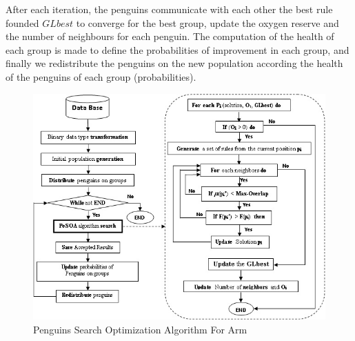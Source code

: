 \documentclass[preprint,12pt]{elsarticle}
\begin{document}
 After each iteration, the penguins communicate with each other the best rule founded  $GLbest$ to converge for the best group, update the oxygen reserve and the number of neighbours  for each penguin. The computation of the health of each group is made to  define the probabilities of improvement in each group, and finally we redistribute the penguins on the new population according the health of the penguins of each group (probabilities). 
\begin{figure}[htbp]
\begin{center}
\includegraphics[width=15cm]{2.jpg}
\end{center}
\caption{Penguins Search Optimization Algorithm For Arm}
\label{algo}
\end{figure}
\end{document}
